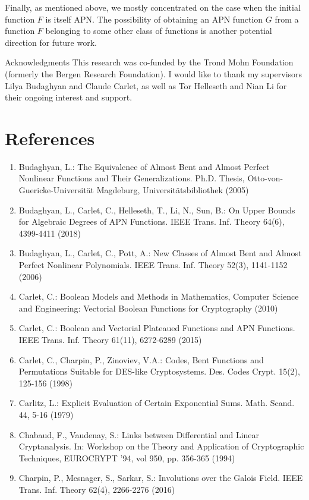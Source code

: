 \documentclass[10pt]{article}
\begin{document}
Finally, as mentioned above, we mostly concentrated on the case when the initial function $F$ is itself APN. The possibility of obtaining an APN function $G$ from a function $F$ belonging to some other class of functions is another potential direction for future work.

Acknowledgments This research was co-funded by the Trond Mohn Foundation (formerly the Bergen Research Foundation). I would like to thank my supervisors Lilya Budaghyan and Claude Carlet, as well as Tor Helleseth and Nian Li for their ongoing interest and support.

\section*{References}
\begin{enumerate}
  \item Budaghyan, L.: The Equivalence of Almost Bent and Almost Perfect Nonlinear Functions and Their Generalizations. Ph.D. Thesis, Otto-von-Guericke-Universität Magdeburg, Universitätsbibliothek (2005)
  \item Budaghyan, L., Carlet, C., Helleseth, T., Li, N., Sun, B.: On Upper Bounds for Algebraic Degrees of APN Functions. IEEE Trans. Inf. Theory 64(6), 4399-4411 (2018)
  \item Budaghyan, L., Carlet, C., Pott, A.: New Classes of Almost Bent and Almost Perfect Nonlinear Polynomials. IEEE Trans. Inf. Theory 52(3), 1141-1152 (2006)
  \item Carlet, C.: Boolean Models and Methods in Mathematics, Computer Science and Engineering: Vectorial Boolean Functions for Cryptography (2010)
  \item Carlet, C.: Boolean and Vectorial Plateaued Functions and APN Functions. IEEE Trans. Inf. Theory 61(11), 6272-6289 (2015)
  \item Carlet, C., Charpin, P., Zinoviev, V.A.: Codes, Bent Functions and Permutations Suitable for DES-like Cryptosystems. Des. Codes Crypt. 15(2), 125-156 (1998)
  \item Carlitz, L.: Explicit Evaluation of Certain Exponential Sums. Math. Scand. 44, 5-16 (1979)
  \item Chabaud, F., Vaudenay, S.: Links between Differential and Linear Cryptanalysis. In: Workshop on the Theory and Application of Cryptographic Techniques, EUROCRYPT '94, vol 950, pp. 356-365 (1994)
  \item Charpin, P., Mesnager, S., Sarkar, S.: Involutions over the Galois Field. IEEE Trans. Inf. Theory 62(4), 2266-2276 (2016)

\end{enumerate}
\end{document}
